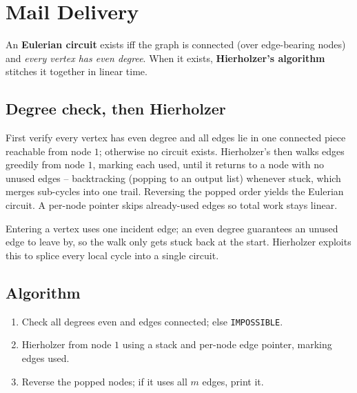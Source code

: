 \section{Mail Delivery}
\label{sec:cses-mail-delivery}


\begin{patternbox}
An \textbf{Eulerian circuit} exists iff the graph is connected (over
edge-bearing nodes) and \emph{every vertex has even degree}. When it
exists, \textbf{Hierholzer's algorithm} stitches it together in linear
time.
\end{patternbox}

\subsection*{Degree check, then Hierholzer}

First verify every vertex has even degree and all edges lie in one
connected piece reachable from node $1$; otherwise no circuit exists.
Hierholzer's then walks edges greedily from node $1$, marking each used,
until it returns to a node with no unused edges -- backtracking (popping to
an output list) whenever stuck, which merges sub-cycles into one trail.
Reversing the popped order yields the Eulerian circuit. A per-node pointer
skips already-used edges so total work stays linear.

\begin{ideabox}
Entering a vertex uses one incident edge; an even degree guarantees an
unused edge to leave by, so the walk only gets stuck back at the start.
Hierholzer exploits this to splice every local cycle into a single circuit.
\end{ideabox}

\subsection*{Algorithm}

\begin{enumerate}
  \item Check all degrees even and edges connected; else
        \texttt{IMPOSSIBLE}.
  \item Hierholzer from node $1$ using a stack and per-node edge pointer,
        marking edges used.
  \item Reverse the popped nodes; if it uses all $m$ edges, print it.
\end{enumerate}

